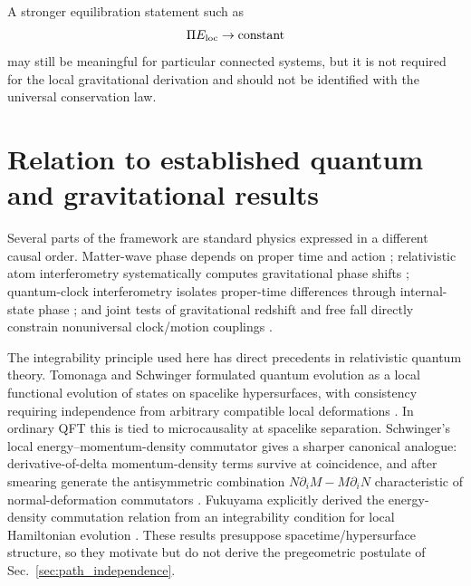 \documentclass[11pt]{article}
\begin{document}
A stronger equilibration statement such as
\begin{equation}
    \Pi E_{\rm loc}\rightarrow\text{constant}
\end{equation}
may still be meaningful for particular connected systems, but it is not required for the local gravitational derivation and should not be identified with the universal conservation law.

\section{Relation to established quantum and gravitational results}

Several parts of the framework are standard physics expressed in a different causal order. Matter-wave phase depends on proper time and action \cite{Stodolsky1979}; relativistic atom interferometry systematically computes gravitational phase shifts \cite{Dimopoulos2008}; quantum-clock interferometry isolates proper-time differences through internal-state phase \cite{Zych2011,Roura2020,Roura2021}; and joint tests of gravitational redshift and free fall directly constrain nonuniversal clock/motion couplings \cite{Ufrecht2020}.

The integrability principle used here has direct precedents in relativistic quantum theory. Tomonaga and Schwinger formulated quantum evolution as a local functional evolution of states on spacelike hypersurfaces, with consistency requiring independence from arbitrary compatible local deformations \cite{Tomonaga1946,Schwinger1948}. In ordinary QFT this is tied to microcausality at spacelike separation. Schwinger's local energy--momentum-density commutator gives a sharper canonical analogue: derivative-of-delta momentum-density terms survive at coincidence, and after smearing generate the antisymmetric combination $N\partial_iM-M\partial_iN$ characteristic of normal-deformation commutators \cite{Schwinger1963}. Fukuyama explicitly derived the energy-density commutation relation from an integrability condition for local Hamiltonian evolution \cite{Fukuyama1973}. These results presuppose spacetime/hypersurface structure, so they motivate but do not derive the pregeometric postulate of Sec.~\ref{sec:path_independence}.
\end{document}
